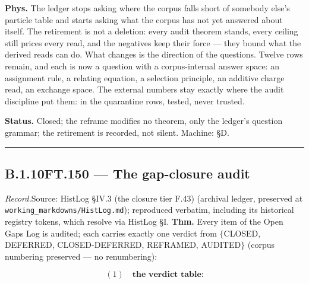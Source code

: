 \documentclass[11pt,openany]{report}
\theoremstyle{canonplain}
\theoremstyle{canondef}
\begin{document}
\textbf{Phys.} The ledger stops asking where the corpus falls short of somebody else's particle table and starts asking what the corpus has not yet answered about itself. The retirement is not a deletion: every audit theorem stands, every ceiling still prices every read, and the negatives keep their force — they bound what the derived reads can do. What changes is the direction of the questions. Twelve rows remain, and each is now a question with a corpus-internal answer space: an assignment rule, a relating equation, a selection principle, an additive charge read, an exchange space. The external numbers stay exactly where the audit discipline put them: in the quarantine rows, tested, never trusted.

\textbf{Status.} Closed; the reframe modifies no theorem, only the ledger's question grammar; the retirement is recorded, not silent. Machine: §D.

\vspace{2pt}\noindent\rule{\textwidth}{0.4pt}\vspace{2pt}

\medskip
\subsection*{\texorpdfstring{B.1.10\quad FT.150 — The gap-closure audit}{FT.150 B.1.10}}
\label{tag:FT-150}
{\small \textit{Record.}\quad Source: HistLog §IV.3 (the closure tier F.43) (archival ledger, preserved at \texttt{working\_markdowns/HistLog.md}); reproduced verbatim, including its historical registry tokens, which resolve via HistLog \S I.}
\medskip
\textbf{Thm.} Every item of the Open Gaps Log is audited; each carries exactly one verdict from $\{$CLOSED, DEFERRED, CLOSED-DEFERRED, REFRAMED, AUDITED$\}$ (corpus numbering preserved — no renumbering):

\[
(1)\quad\textbf{the verdict table:}
\]
\end{document}
